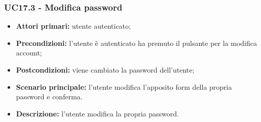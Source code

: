 \subsubsection{UC17.3 - Modifica password}
\begin{itemize}
	\item 	\textbf{Attori primari:} utente autenticato;
	\item 	\textbf{Precondizioni:} l'utente è autenticato ha premuto il pulsante per la modifica account;
	\item 	\textbf{Postcondizioni:} viene cambiato la password dell'utente;
	\item 	\textbf{Scenario principale:} l'utente modifica l'apposito form della propria password e conferma.
	\item 	\textbf{Descrizione:} l'utente modifica la propria password.
\end{itemize}
